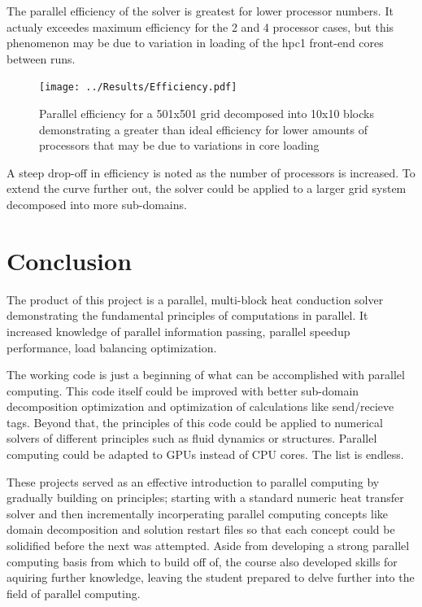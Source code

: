 \documentclass[twocolumn,10pt]{asme2ej}
\begin{document}
The parallel efficiency of the solver is greatest for lower processor numbers.  It actualy exceedes maximum efficiency for the 2 and 4 processor cases, but this phenomenon may be due to variation in loading of the hpc1 front-end cores between runs.

\begin{figure}[htb]
\begin{center}
\texttt{[image: ../Results/Efficiency.pdf]}
\caption{Parallel efficiency for a 501x501 grid decomposed into 10x10 blocks demonstrating a greater than ideal efficiency for lower amounts of processors that may be due to variations in core loading}
\label{Effish}
\end{center}
\end{figure}

A steep drop-off in efficiency is noted as the number of processors is increased.  To extend the curve further out, the solver could be applied to a larger grid system decomposed into more sub-domains.

\section{Conclusion}

The product of this project is a parallel, multi-block heat conduction solver demonstrating the fundamental principles of computations in parallel.  It increased knowledge of parallel information passing, parallel speedup performance, load balancing optimization.

The working code is just a beginning of what can be accomplished with parallel computing.  This code itself could be improved with better sub-domain decomposition optimization and optimization of calculations like send/recieve tags.  Beyond that, the principles of this code could be applied to numerical solvers of different principles such as fluid dynamics or structures.  Parallel computing could be adapted to GPUs instead of CPU cores.  The list is endless.

These projects served as an effective introduction to parallel computing by gradually building on principles; starting with a standard numeric heat transfer solver and then incrementally incorperating parallel computing concepts like domain decomposition and solution restart files so that each concept could be solidified before the next was attempted.  Aside from developing a strong parallel computing basis from which to build off of, the course also developed skills for aquiring further knowledge, leaving the student prepared to delve further into the field of parallel computing.
\end{document}
